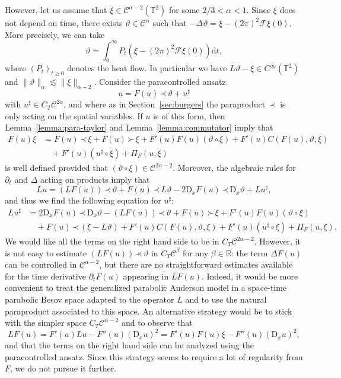 \documentclass[a4paper,11pt]{article}
\newcommand{\mathD}{\mathrm{D}}
\newcommand{\mathd}{\mathrm{d}}
\theoremstyle{remark}
\newcommand{\CC}{\ensuremath{\mathscr{C}}}
\newcommand{\CF}{\ensuremath{\mathscr{F}}}
\newcommand{\lpara}{\,\mathord{\prec}\,}
\newcommand{\rpara}{\,\mathord{\succ}\,}
\newcommand{\reso}{\,\mathord{\circ}\,}
\begin{document}
However, let us assume that $\xi \in \CC^{\alpha -2} ( \mathbb{T}^{2} )$ for
some $2/3< \alpha <1$. Since $\xi$ does not depend on time, there exists $\vartheta \in \CC^\alpha$ such that $-\Delta \vartheta = \xi - (2\pi)^{2} \CF \xi(0)$. More precisely, we can take
\begin{equation}\label{eq:pam theta def}
   \vartheta = \int_0^\infty P_t (\xi - (2\pi)^{2} \CF \xi(0)) \mathd t,
\end{equation}
where $(P_t)_{t \geqslant 0}$ denotes the heat flow. In particular we have $L\vartheta - \xi \in C^\infty(\mathbb{T}^2)$ and $\|\vartheta\|_\alpha \lesssim \|\xi\|_{\alpha-2}$. Consider the paracontrolled ansatz
\[
   u=F ( u ) \lpara \vartheta +u^{\sharp}
\]
with $u^{\sharp} \in C_{T} \CC^{2 \alpha}$, and where as in Section~\ref{sec:burgers} the paraproduct $\lpara$ is only acting on the spatial
variables. If $u$ is of this form, then Lemma~\ref{lemma:para-taylor} and
Lemma~\ref{lemma:commutator} imply that
\begin{align*}
   F ( u ) \xi & =F ( u ) \lpara \xi +F ( u ) \rpara \xi +F' ( u ) F ( u )  (
   \vartheta \reso \xi ) +F' ( u ) C ( F ( u ) , \vartheta , \xi ) \\
   &\quad +F' ( u )  ( u^{\sharp} \reso \xi ) + \Pi_{F} ( u, \xi )
\end{align*}
is well defined provided that $( \vartheta \reso   \xi ) \in \CC^{2 \alpha -2}$. Moreover, the algebraic rules for $\partial_{t}$ and $\Delta$
acting on products imply that
\[
   L u= ( L F ( u ) ) \lpara \vartheta +F ( u ) \lpara L  \vartheta - 2 \mathD_{x} F ( u ) \lpara \mathD_{x} \vartheta +L u^{\sharp},
\]
and thus we find the following equation for $u^{\sharp}$:
\begin{align*}
   L u^{\sharp} & = 2 \mathD_{x} F ( u ) \lpara \mathD_{x} \vartheta - ( L F ( u ) ) \lpara \vartheta +F ( u ) \rpara \xi + F' ( u ) F ( u )  ( \vartheta \reso \xi ) \\
    &\quad + F(u)\lpara (\xi - L\vartheta) +F' ( u ) C ( F ( u ) , \vartheta , \xi ) +F' ( u )  ( u^{\sharp} \reso \xi) + \Pi_{F} ( u, \xi ).
 \end{align*}
We would like all the terms on the right hand side to be in $C_{T} \CC^{2 \alpha -2}$. However, it is not easy to estimate $( LF ( u ) ) \lpara \vartheta$ in $C_{T} \CC^{\beta}$ for any $\beta \in \mathbb{R}$: the term $\Delta F ( u )$ can be controlled in $\CC^{\alpha-2}$, but there are no straightforward estimates available for the time derivative $\partial_{t} F ( u )$ appearing in $L F ( u )$. Indeed, it would
be more convenient to treat the generalized parabolic Anderson model in a
space-time parabolic Besov space adapted to the operator $L$ and to use the
natural paraproduct associated to this space. An alternative strategy would be
to stick with the simpler space $C_{T} \CC^{\alpha -2}$ and to observe that
\[
   L F ( u ) =F' ( u ) L u - F'' ( u ) ( \mathD_{x} u )^{2} =F' ( u ) F ( u ) \xi - F'' ( u ) ( \mathD_{x} u )^{2},
\]
and that the terms on the right hand side can be analyzed using the
paracontrolled ansatz. Since this strategy seems to require a lot of
regularity from $F$, we do not pursue it further.
\end{document}
